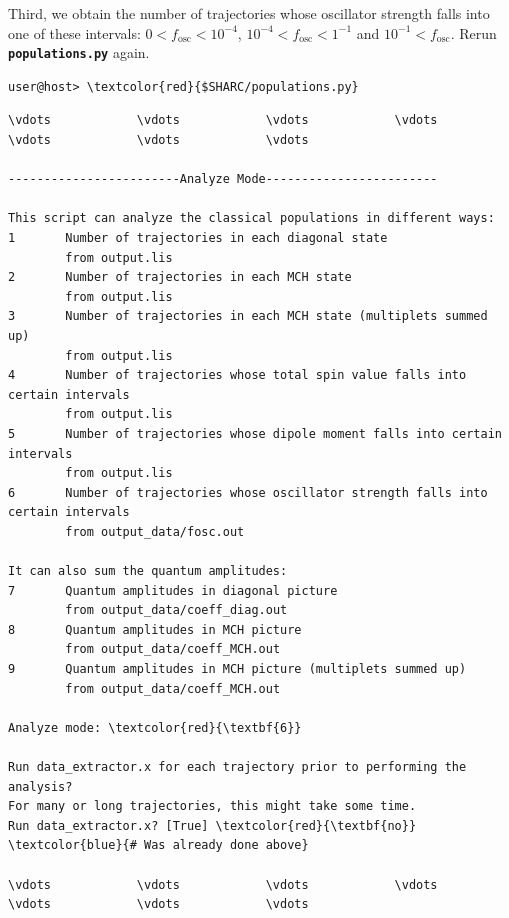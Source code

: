 \documentclass[a4paper,11pt,DIV=15,openany]{scrbook}
\newcommand{\ttt}[1]{\textbf{\texttt{#1}}}
\begin{document}
\normalsize
Third, we obtain the number of trajectories whose oscillator strength falls into one of these intervals: $0<f_\text{osc}<10^{-4}$, $10^{-4}<f_\text{osc}<1^{-1}$ and $10^{-1}<f_\text{osc}$. Rerun \ttt{populations.py} again.
\begin{Verbatim}[commandchars=\\\{\}]
user@host> \textcolor{red}{$SHARC/populations.py}
\end{Verbatim}

\begin{oframed}
\footnotesize\begin{Verbatim}[commandchars=\\\{\}]
\vdots            \vdots            \vdots            \vdots            \vdots            \vdots            \vdots            

------------------------Analyze Mode------------------------

This script can analyze the classical populations in different ways:
1       Number of trajectories in each diagonal state                                   
        from output.lis
2       Number of trajectories in each MCH state                                        
        from output.lis
3       Number of trajectories in each MCH state (multiplets summed up)                 
        from output.lis
4       Number of trajectories whose total spin value falls into certain intervals      
        from output.lis
5       Number of trajectories whose dipole moment falls into certain intervals         
        from output.lis
6       Number of trajectories whose oscillator strength falls into certain intervals   
        from output_data/fosc.out

It can also sum the quantum amplitudes:
7       Quantum amplitudes in diagonal picture                                          
        from output_data/coeff_diag.out
8       Quantum amplitudes in MCH picture                                               
        from output_data/coeff_MCH.out
9       Quantum amplitudes in MCH picture (multiplets summed up)                        
        from output_data/coeff_MCH.out

Analyze mode: \textcolor{red}{\textbf{6}}

Run data_extractor.x for each trajectory prior to performing the analysis?
For many or long trajectories, this might take some time.
Run data_extractor.x? [True] \textcolor{red}{\textbf{no}}          \textcolor{blue}{# Was already done above}

\vdots            \vdots            \vdots            \vdots            \vdots            \vdots            \vdots            


\end{Verbatim}
\end{oframed}
\end{document}
